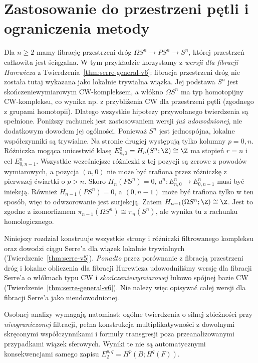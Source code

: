 \section{Zastosowanie do przestrzeni pętli i ograniczenia metody}
Dla $n\ge2$ mamy fibrację przestrzeni dróg
$\Omega S^n\to PS^n\to S^n$, której przestrzeń całkowita
jest ściągalna. W tym przykładzie korzystamy z \emph{wersji dla
fibracji Hurewicza} z
Twierdzenia~\ref{thm:serre-general-v6}:
fibracja przestrzeni dróg nie została tutaj wykazana
jako lokalnie trywialna wiązka.
Jej podstawa $S^n$ jest skończeniewymiarowym
CW-kompleksem, a włókno $\Omega S^n$
ma typ homotopijny CW-kompleksu, co wynika
np. z przybliżenia CW dla przestrzeni pętli
(zgodnego z grupami homotopii).
Dlatego wszystkie hipotezy przywołanego
twierdzenia są spełnione. Poniższy rachunek
jest zastosowaniem wersji \emph{już udowodnionej},
nie dodatkowym dowodem jej ogólności. Ponieważ $S^n$ jest jednospójna,
lokalne współczynniki są trywialne. Na stronie drugiej
występują tylko kolumny $p=0,n$.
Różniczka mogąca unicestwić klasę
$E^2_{n,0}=H_n(S^n;\Z)\cong\Z$ ma stopień $r=n$
i cel $E^n_{0,n-1}$. Wszystkie wcześniejsze różniczki
z tej pozycji są zerowe z powodów wymiarowych,
a pozycja $(n,0)$ nie może być trafiona przez różniczkę
z pierwszej ćwiartki o $p>n$. Skoro $H_n(PS^n)=0$,
$d^n:E^n_{n,0}\to E^n_{0,n-1}$ musi być iniekcją.
Również $H_{n-1}(PS^n)=0$, a $(0,n-1)$ może być
trafiona tylko w ten sposób, więc to odwzorowanie jest surjekcją.
Zatem $H_{n-1}(\Omega S^n;\Z)\cong\Z$.
Jest to zgodne z izomorfizmem
$\pi_{n-1}(\Omega S^n)\cong\pi_n(S^n)$, ale wynika tu
z rachunku homologicznego.

\begin{uwaga}
Niniejszy rozdział konstruuje wszystkie strony i różniczki
filtrowanego kompleksu oraz dowodzi ciągu Serre'a
dla wiązek lokalnie trywialnych
(Twierdzenie~\ref{thm:serre-v5}).
\emph{Ponadto} przez porównanie z fibracją przestrzeni
dróg i lokalne obliczenia dla fibracji Hurewicza
udowodniliśmy wersję dla fibracji Serre'a
o włóknach typu CW i \emph{skończeniewymiarowej}
łukowo spójnej bazie CW
(Twierdzenie~\ref{thm:serre-general-v6}).
Nie należy więc opisywać całej wersji dla fibracji
Serre'a jako nieudowodnionej.

Osobnej analizy wymagają natomiast:
ogólne twierdzenia o silnej zbieżności przy
\emph{nieograniczonej} filtracji, pełna konstrukcja
multiplikatywności z dowolnymi skręconymi
współczynnikami i formuły transgresji poza
przeanalizowanymi przypadkami wiązek sferowych.
Wyniki te nie są automatycznymi konsekwencjami
samego zapisu $E_2^{p,q}=H^p(B;H^q(F))$.
\end{uwaga}

